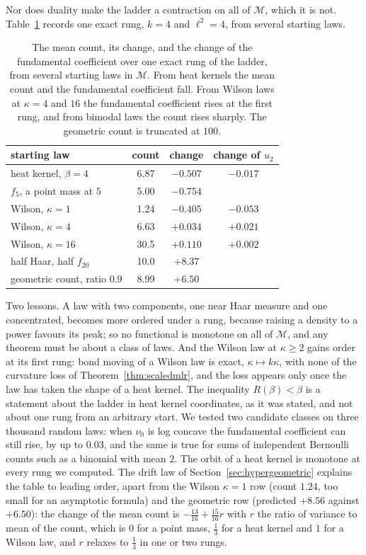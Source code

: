 Nor does duality make the ladder a contraction on all of $\mathcal M$, which it is not. Table~\ref{tab:notmonotone} records one exact rung, $k=4$ and $\ell^2=4$, from several starting laws.

\begin{table}[t]
\centering\small
\begin{tabular}{lccc}
\toprule
starting law & count & change & change of $u_2$ \\ \midrule
heat kernel, $\beta=4$ & 6.87 & $-0.507$ & $-0.017$ \\
$f_5$, a point mass at $5$ & 5.00 & $-0.754$ & \\
Wilson, $\kappa=1$ & 1.24 & $-0.405$ & $-0.053$ \\
Wilson, $\kappa=4$ & 6.63 & $+0.034$ & $+0.021$ \\
Wilson, $\kappa=16$ & 30.5 & $+0.110$ & $+0.002$ \\
half Haar, half $f_{20}$ & 10.0 & $+8.37$ & \\
geometric count, ratio $0.9$ & 8.99 & $+6.50$ & \\
\bottomrule
\end{tabular}
\caption[One exact rung from several starting laws]{The mean count, its change, and the change of the fundamental coefficient over one exact rung of the ladder, from several starting laws in $\mathcal M$. From heat kernels the mean count and the fundamental coefficient fall. From Wilson laws at $\kappa=4$ and $16$ the fundamental coefficient rises at the first rung, and from bimodal laws the count rises sharply. The geometric count is truncated at $100$.}
\label{tab:notmonotone}
\end{table}

Two lessons. A law with two components, one near Haar measure and one concentrated, becomes more ordered under a rung, because raising a density to a power favours its peak; so no functional is monotone on all of $\mathcal M$, and any theorem must be about a class of laws. And the Wilson law at $\kappa\ge2$ gains order at its first rung: bond moving of a Wilson law is exact, $\kappa\mapsto k\kappa$, with none of the curvature loss of Theorem~\ref{thm:scaledmlr}, and the loss appears only once the law has taken the shape of a heat kernel. The inequality $R(\beta)<\beta$ is a statement about the ladder in heat kernel coordinates, as it was stated, and not about one rung from an arbitrary start. We tested two candidate classes on three thousand random laws: when $\nu_0$ is log concave the fundamental coefficient can still rise, by up to $0.03$, and the same is true for sums of independent Bernoulli counts such as a binomial with mean $2$. The orbit of a heat kernel is monotone at every rung we computed. The drift law of Section~\ref{sec:hypergeometric} explains the table to leading order, apart from the Wilson $\kappa=1$ row (count $1.24$, too small for an asymptotic formula) and the geometric row (predicted $+8.56$ against $+6.50$): the change of the mean count is $-\frac{13}{16}+\frac{15}{16}r$ with $r$ the ratio of variance to mean of the count, which is $0$ for a point mass, $\frac13$ for a heat kernel and $1$ for a Wilson law, and $r$ relaxes to $\frac13$ in one or two rungs.

